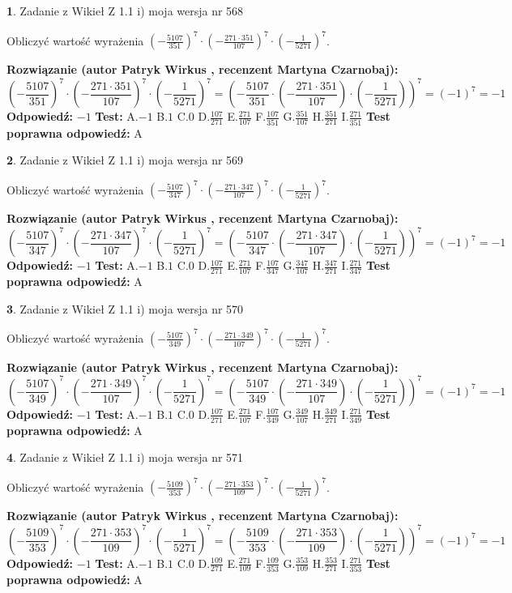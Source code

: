 \documentclass[12pt, a4paper]{article}
\theoremstyle{definition} %
\newtheorem{zad}{}
\newcommand{\zadStart}[1]{\begin{zad}#1\newline}
\newcommand{\zadStop}{\end{zad}}
\newcommand{\rozwStart}[2]{\noindent \textbf{Rozwiązanie (autor #1 , recenzent #2): }\newline}
\newcommand{\rozwStop}{\newline}
\newcommand{\odpStart}{\noindent \textbf{Odpowiedź:}\newline}
\newcommand{\odpStop}{\newline}
\newcommand{\testStart}{\noindent \textbf{Test:}\newline}
\newcommand{\testStop}{\newline}
\newcommand{\kluczStart}{\noindent \textbf{Test poprawna odpowiedź:}\newline}
\newcommand{\kluczStop}{\newline}
\begin{document}
\zadStart{Zadanie z Wikieł Z 1.1 i) moja wersja nr 568}

Obliczyć wartość wyrażenia $(-\frac{5107}{351})^{7} \cdot (-\frac{271 \cdot 351}{107})^{7} \cdot (-\frac{1}{5271})^{7}$.
\zadStop
\rozwStart{Patryk Wirkus}{Martyna Czarnobaj}
$$(-\frac{5107}{351})^{7} \cdot (-\frac{271 \cdot 351}{107})^{7} \cdot (-\frac{1}{5271})^{7} = (-\frac{5107}{351} \cdot (-\frac{271 \cdot 351}{107}) \cdot (-\frac{1}{5271}))^{7} = (-1)^{7} = -1$$
\rozwStop
\odpStart
$-1$
\odpStop
\testStart
A.$-1$ B.$1$ C.$0$ D.$\frac{107}{271}$ E.$\frac{271}{107}$
F.$\frac{107}{351}$ G.$\frac{351}{107}$
H.$\frac{351}{271}$
I.$\frac{271}{351}$
\testStop
\kluczStart
A
\kluczStop



\zadStart{Zadanie z Wikieł Z 1.1 i) moja wersja nr 569}

Obliczyć wartość wyrażenia $(-\frac{5107}{347})^{7} \cdot (-\frac{271 \cdot 347}{107})^{7} \cdot (-\frac{1}{5271})^{7}$.
\zadStop
\rozwStart{Patryk Wirkus}{Martyna Czarnobaj}
$$(-\frac{5107}{347})^{7} \cdot (-\frac{271 \cdot 347}{107})^{7} \cdot (-\frac{1}{5271})^{7} = (-\frac{5107}{347} \cdot (-\frac{271 \cdot 347}{107}) \cdot (-\frac{1}{5271}))^{7} = (-1)^{7} = -1$$
\rozwStop
\odpStart
$-1$
\odpStop
\testStart
A.$-1$ B.$1$ C.$0$ D.$\frac{107}{271}$ E.$\frac{271}{107}$
F.$\frac{107}{347}$ G.$\frac{347}{107}$
H.$\frac{347}{271}$
I.$\frac{271}{347}$
\testStop
\kluczStart
A
\kluczStop



\zadStart{Zadanie z Wikieł Z 1.1 i) moja wersja nr 570}

Obliczyć wartość wyrażenia $(-\frac{5107}{349})^{7} \cdot (-\frac{271 \cdot 349}{107})^{7} \cdot (-\frac{1}{5271})^{7}$.
\zadStop
\rozwStart{Patryk Wirkus}{Martyna Czarnobaj}
$$(-\frac{5107}{349})^{7} \cdot (-\frac{271 \cdot 349}{107})^{7} \cdot (-\frac{1}{5271})^{7} = (-\frac{5107}{349} \cdot (-\frac{271 \cdot 349}{107}) \cdot (-\frac{1}{5271}))^{7} = (-1)^{7} = -1$$
\rozwStop
\odpStart
$-1$
\odpStop
\testStart
A.$-1$ B.$1$ C.$0$ D.$\frac{107}{271}$ E.$\frac{271}{107}$
F.$\frac{107}{349}$ G.$\frac{349}{107}$
H.$\frac{349}{271}$
I.$\frac{271}{349}$
\testStop
\kluczStart
A
\kluczStop



\zadStart{Zadanie z Wikieł Z 1.1 i) moja wersja nr 571}

Obliczyć wartość wyrażenia $(-\frac{5109}{353})^{7} \cdot (-\frac{271 \cdot 353}{109})^{7} \cdot (-\frac{1}{5271})^{7}$.
\zadStop
\rozwStart{Patryk Wirkus}{Martyna Czarnobaj}
$$(-\frac{5109}{353})^{7} \cdot (-\frac{271 \cdot 353}{109})^{7} \cdot (-\frac{1}{5271})^{7} = (-\frac{5109}{353} \cdot (-\frac{271 \cdot 353}{109}) \cdot (-\frac{1}{5271}))^{7} = (-1)^{7} = -1$$
\rozwStop
\odpStart
$-1$
\odpStop
\testStart
A.$-1$ B.$1$ C.$0$ D.$\frac{109}{271}$ E.$\frac{271}{109}$
F.$\frac{109}{353}$ G.$\frac{353}{109}$
H.$\frac{353}{271}$
I.$\frac{271}{353}$
\testStop
\kluczStart
A
\kluczStop
\end{document}
